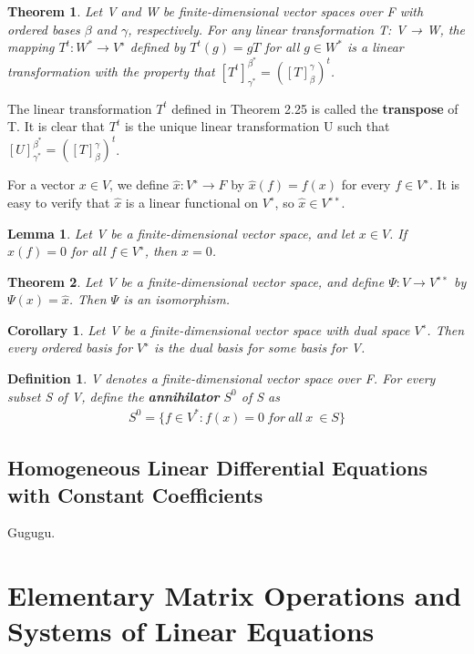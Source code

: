 \documentclass{article}
\newcommand{\bd}[1]{\textbf{#1}}
\theoremstyle{plain}
\newtheorem{theorem}{Theorem}[section]
\newtheorem*{lemma1}{Lemma}
\newtheorem*{corollary}{Corollary}
\newtheorem*{definition1}{Definition}
\theoremstyle{plain} %
\begin{document}
\begin{theorem}
Let V and W be finite-dimensional vector spaces over F with ordered bases $\beta$ and $\gamma$, respectively. For any linear transformation T: V → W, the mapping $T^t : W^* \to V^∗$ defined by $T^t(g) = gT$ for all $g\in W^*$ is a linear transformation with the property that $[T^t]_{\gamma^*}^{\beta^*}={([T]_\beta^\gamma)}^t$.
\end{theorem}

The linear transformation $T^t$ defined in Theorem 2.25 is called the \bd{transpose} of T. It is clear that $T^t$ is the unique linear transformation U such that $[U]_{\gamma^*}^{\beta^*}=([T]_\beta^\gamma)^t$.

For a vector $x \in V$, we define $\hat{x}: V^∗ \to F$ by $\hat{x}(f) = f(x)$ for every $f \in V^∗$. It is easy to verify that $\hat{x}$ is a linear functional on $V^∗$, so $\hat{x} \in V^{∗∗}$.

\begin{lemma1}
Let V be a finite-dimensional vector space, and let $x \in V$. If $\hat{x}(f)=0$ for all $f \in V^∗$, then $x = 0$.
\end{lemma1}

\begin{theorem}
Let V be a finite-dimensional vector space, and define $\Psi: V \to V^{∗∗}$ by $\Psi(x) = \hat{x}$. Then $\Psi$ is an isomorphism.
\end{theorem}

\begin{corollary}
Let V be a finite-dimensional vector space with dual space $V^∗$. Then every ordered basis for $V^∗$ is the dual basis for some basis for V.
\end{corollary}

\begin{definition1}
V denotes a finite-dimensional vector space over F. For every subset S of V, define the \bd{annihilator} $S^0$ of S as
\begin{align*}
S^0 = \{ f \in V^* : f(x) = 0~for~all~x~\in S\}
\end{align*}
\end{definition1}

\subsection{Homogeneous Linear Differential Equations with Constant Coefficients}

Gugugu.

\section {Elementary Matrix Operations and Systems of Linear Equations}
\end{document}
